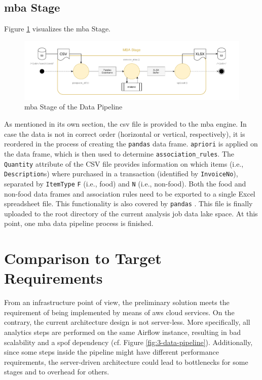 \subsection{\acs{mba} Stage}
Figure \ref{fig:3-mba} visualizes the \ac{mba} Stage.

\begin{figure}[h!]
	\includegraphics[width=\linewidth]{main-matter/img/3-3-4-mba}
	\caption{\acs{mba} Stage of the Data Pipeline}
	\label{fig:3-mba}	
\end{figure}

As mentioned in its own section, the \ac{csv} file is provided to the \ac{mba} engine. In case the data is not in correct order (horizontal or vertical, respectively), it is reordered in the process of creating the \texttt{pandas} data frame. \texttt{apriori} is applied on the data frame, which is then used to determine \texttt{association\_rules}. The \texttt{Quantity} attribute of the CSV file provides information on which items (i.e., \texttt{Description}s) where purchased in a transaction (identified by \texttt{InvoiceNo}), separated by \texttt{ItemType} \texttt{F} (i.e., food) and \texttt{N} (i.e., non-food). Both the food and non-food data frames and association rules need to be exported to a single Excel spreadsheet file. This functionality is also covered by \texttt{pandas} \cite{pandas}. This file is finally uploaded to the root directory of the current analysis job data lake space. At this point, one \ac{mba} data pipeline process is finished. 


\section{Comparison to Target Requirements}
From an infrastructure point of view, the preliminary solution meets the requirement of being implemented by means of \ac{aws} cloud services. On the contrary, the current architecture design is not server-less. More specifically, all analytics steps are performed on the same Airflow instance, resulting in bad scalability and a \ac{spof} dependency (cf. Figure \ref{fig:3-data-pipeline}). Additionally, since some steps inside the pipeline might have different performance requirements, the server-driven architecture could lead to bottlenecks for some stages and to overhead for others.

